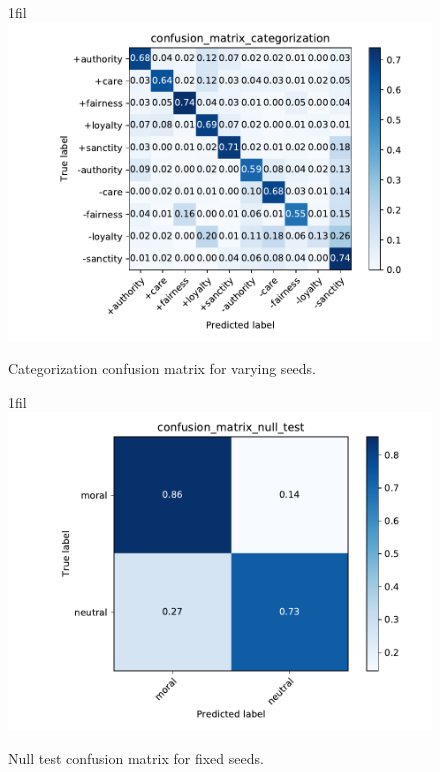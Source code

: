 \documentclass{article}
\makeatletter
\newcommand*{\centerfloat}{%
  \parindent \z@
  \leftskip \z@ \@plus 1fil \@minus \textwidth
  \rightskip\leftskip
  \parfillskip \z@skip}
\makeatother
\begin{document}
\begin{figure}[H]
    \centerfloat
    \includegraphics[width=1.5\linewidth]{confusion-matrix-centroid-varying-seeds/confusion_matrix_categorization.pdf}
    \caption{Categorization confusion matrix for varying seeds.}
    \label{fig:confusion-categorization-varying}
\end{figure}

\begin{figure}[H]
    \centerfloat
    \includegraphics[width=1.5\linewidth]{confusion-matrix-centroid-fixed-seeds/confusion_matrix_null_test.pdf}
    \caption{Null test confusion matrix for fixed seeds.}
    \label{fig:confusion-null-fixed}
\end{figure}
\end{document}
